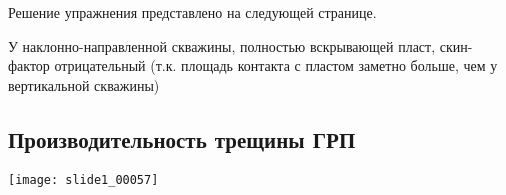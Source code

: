 \documentclass[main.tex]{subfiles}
\begin{document}
Решение упражнения представлено на следующей странице.




У наклонно-направленной скважины, полностью вскрывающей пласт, скин-фактор отрицательный (т.к. площадь контакта с пластом заметно больше, чем у вертикальной скважины)


\subsection{Производительность трещины ГРП}

\texttt{[image: slide1\_00057]}










\end{document}
